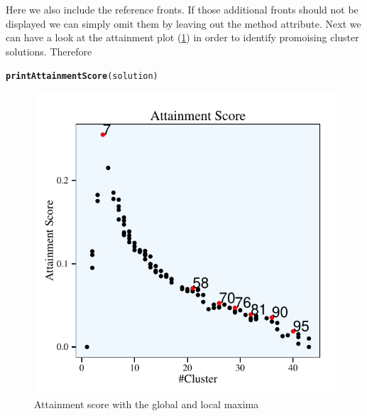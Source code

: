 \documentclass[parskip=half,DIV=14]{scrartcl}\usepackage[]{graphicx}\usepackage[]{color}
\makeatletter
\def\maxwidth{ %
  \ifdim\Gin@nat@width>\linewidth
    \linewidth
  \else
    \Gin@nat@width
  \fi
}
\newcommand{\hlstd}[1]{\textcolor[rgb]{0.345,0.345,0.345}{#1}}%
\newcommand{\hlkwd}[1]{\textcolor[rgb]{0.737,0.353,0.396}{\textbf{#1}}}%
\newenvironment{kframe}{%
 \def\at@end@of@kframe{}%
 \ifinner\ifhmode%
  \def\at@end@of@kframe{\end{minipage}}%
  \begin{minipage}{\columnwidth}%
 \fi\fi%
 \def\FrameCommand##1{\hskip\@totalleftmargin \hskip-\fboxsep
 \colorbox{shadecolor}{##1}\hskip-\fboxsep
     \hskip-\linewidth \hskip-\@totalleftmargin \hskip\columnwidth}%
 \MakeFramed {\advance\hsize-\width
   \@totalleftmargin\z@ \linewidth\hsize
   \@setminipage}}%
 {\par\unskip\endMakeFramed%
 \at@end@of@kframe}
\newenvironment{knitrout}{}{} %
\makeatother
\begin{document}
Here we also include the reference fronts. If those additional fronts should not be displayed we can simply omit them by leaving out the method attribute. Next we can have a look at the attainment plot (\ref{fig:attainment}) in order to identify promoising cluster solutions. Therefore 
\begin{knitrout}
\color{fgcolor}\begin{kframe}
\begin{alltt}
\hlkwd{printAttainmentScore}\hlstd{(solution)}
\end{alltt}
\end{kframe}
\end{knitrout}
\begin{figure}
\begin{center}
\begin{knitrout}
\color{fgcolor}

{\centering \includegraphics[width=\maxwidth]{figures/plots-attainment-1} 

}



\end{knitrout}
\caption{Attainment score with the global and local maxima}
\label{fig:attainment}
\end{center}
\end{figure}
\end{document}

